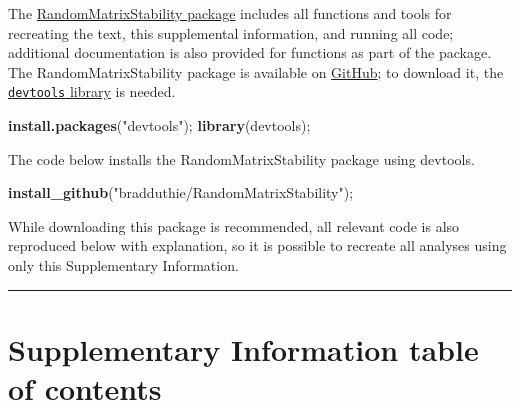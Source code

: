 \documentclass[]{article}
\newenvironment{Shaded}{\begin{snugshade}}{\end{snugshade}}
\newcommand{\KeywordTok}[1]{\textcolor[rgb]{0.13,0.29,0.53}{\textbf{{#1}}}}
\newcommand{\StringTok}[1]{\textcolor[rgb]{0.31,0.60,0.02}{{#1}}}
\newcommand{\NormalTok}[1]{{#1}}
\begin{document}
The
\href{https://github.com/bradduthie/RandomMatrixStability}{RandomMatrixStability
package} includes all functions and tools for recreating the text, this
supplemental information, and running all code; additional documentation
is also provided for functions as part of the package. The
RandomMatrixStability package is available on
\href{https://github.com/bradduthie/RandomMatrixStability}{GitHub}; to
download it, the
\href{https://cran.r-project.org/web/packages/devtools/index.html}{\texttt{devtools}
library} is needed.

\begin{Shaded}
\begin{Highlighting}[]
\KeywordTok{install.packages}\NormalTok{(}\StringTok{"devtools"}\NormalTok{);}
\KeywordTok{library}\NormalTok{(devtools);}
\end{Highlighting}
\end{Shaded}

The code below installs the RandomMatrixStability package using
devtools.

\begin{Shaded}
\begin{Highlighting}[]
\KeywordTok{install_github}\NormalTok{(}\StringTok{"bradduthie/RandomMatrixStability"}\NormalTok{);}
\end{Highlighting}
\end{Shaded}

While downloading this package is recommended, all relevant code is also
reproduced below with explanation, so it is possible to recreate all
analyses using only this Supplementary Information.

\begin{center}\rule{0.5\linewidth}{\linethickness}\end{center}

\section{Supplementary Information table of
contents}\label{supplemental-information-table-of-contents}
\end{document}
